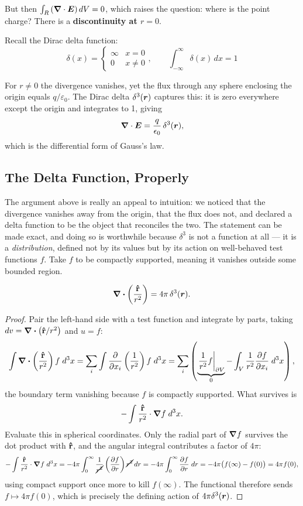 But then $\int_R \left(\grad\cdot\vect{E}\right) dV = 0$, which raises the question: where is the point charge? There is a \textbf{discontinuity at $r=0$}.

Recall the Dirac delta function:
\[
    \delta(x) = \begin{cases} \infty & x = 0 \\ 0 & x \neq 0 \end{cases}, \qquad \int_{-\infty}^{\infty} \delta(x)\,dx = 1
\]

For $r\neq 0$ the divergence vanishes, yet the flux through any sphere enclosing the origin equals $q/\varepsilon_0$. The Dirac delta $\delta^3(\bm{r})$ captures this: it is zero everywhere except the origin and integrates to 1, giving
\[
    \grad\cdot\vect{E} = \frac{q}{\epsilon_0}\,\delta^3(\lvect{r}),
\]
which is the differential form of Gauss's law.

\subsection{The Delta Function, Properly}
\label{sec:em-delta}

The argument above is really an appeal to intuition: we noticed that the divergence vanishes away from the origin, that the flux does not, and declared a delta function to be the object that reconciles the two. The statement can be made exact, and doing so is worthwhile because $\delta^3$ is not a function at all --- it is a \emph{distribution}, defined not by its values but by its action on well-behaved test functions $f$. Take $f$ to be compactly supported, meaning it vanishes outside some bounded region.

\begin{theorem}
\[
    \div\left(\frac{\boldsymbol{\hat{\textbf{r}}}}{r^2}\right) = 4\pi\,\delta^3(\bm{r}).
\]
\end{theorem}

\begin{proof}
Pair the left-hand side with a test function and integrate by parts, taking $dv = \div(\boldsymbol{\hat{\textbf{r}}}/r^2)$ and $u = f$:
\[
    \int \div\left(\frac{\boldsymbol{\hat{\textbf{r}}}}{r^2}\right) f\; d^3x
    = \sum_i \int \pdv{x_i}\left(\frac{1}{r^2}\right) f\; d^3x
    = \sum_i \left(\underbrace{\left.\frac{1}{r^2}f\right|_{\partial V}}_{0} - \int_V \frac{1}{r^2}\pdv{f}{x_i}\; d^3x\right),
\]
the boundary term vanishing because $f$ is compactly supported. What survives is
\[
    -\int \frac{\boldsymbol{\hat{\textbf{r}}}}{r^2}\cdot\grad f\; d^3x .
\]
Evaluate this in spherical coordinates. Only the radial part of $\grad f$ survives the dot product with $\boldsymbol{\hat{\textbf{r}}}$, and the angular integral contributes a factor of $4\pi$:
\[
    -\int \frac{\boldsymbol{\hat{\textbf{r}}}}{r^2}\cdot\grad f\; d^3x = -4\pi\int_0^\infty \frac{1}{\cancel{r^2}}\left(\pdv{f}{r}\right)\cancel{r^2}\,dr
    = -4\pi\int_0^\infty \pdv{f}{r}\; dr = -4\pi\bigl(f(\infty) - f(0)\bigr) = 4\pi f(0),
\]
using compact support once more to kill $f(\infty)$. The functional therefore sends $f\mapsto 4\pi f(0)$, which is precisely the defining action of $4\pi\delta^3(\bm{r})$.
\end{proof}

